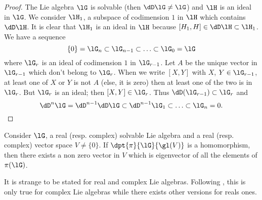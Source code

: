\begin{proof}
	The Lie algebra $\lG$ is solvable (then $\dD\lG\neq\lG$) and $\lH$ is an ideal in $\lG$. We consider $\lH_1$, a subspace of codimension $1$ in $\lH$ which contains $\dD\lH$. It is clear that $\lH_1$ is an ideal in $\lH$ because $[H_1,H]\in\dD\lH\subset\lH_1$.
	We have a sequence
	\begin{equation}\label{eq:solvable_chaine}
		\{0\}=\lG_n\subset\lG_{n-1}\subset\ldots\subset\lG_0=\lG
	\end{equation}
	where $\lG_r$ is an ideal of codimension $1$ in $\lG_{r-1}$. Let $A$ be the unique vector in $\lG_{r-1}$ which don't belong to $\lG_r$.  When we write $[X,Y]$ with $X$, $Y\in\lG_{r-1}$, at least one of $X$ or $Y$ is not $A$ (else, it is zero) then at least one of the two is in $\lG_r$. But $\lG_r$ is an ideal; then $[X,Y]\in\lG_r$. Thus $\dD(\lG_{r-1})\subset\lG_r$ and
	\[
		\dD^n\lG=\dD^{n-1}\dD\lG\subset\dD^{n-1}\lG_1\subset\ldots\subset\lG_n=0.
	\]
\end{proof}

\begin{theorem}\label{tho:Lie_Vu}
	Consider $\lG$, a real (resp. complex) solvable Lie algebra and a real (resp. complex) vector space $V\neq\{0\}$. If $\dpt{\pi}{\lG}{\gl(V)}$ is a homomorphism, then there exists a non zero vector in $V$ which is eigenvector of all the elements of $\pi(\lG)$.
\end{theorem}

\begin{probleme}
	It is strange to be stated for real and complex Lie algebras. Following \cite{SamelsonNotesLieAlg}, this is only true for complex Lie algebras while there exists other versions for reals ones.
\end{probleme}

